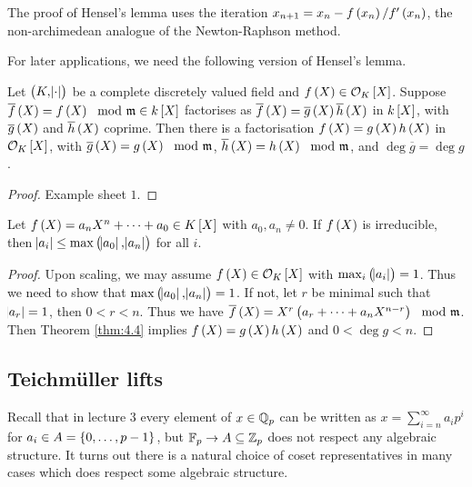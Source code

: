 \begin{remark*}
The proof of Hensel's lemma uses the iteration $ x_{n + 1} = x_n - f\br{x_n} / f'\br{x_n} $, the non-archimedean analogue of the Newton-Raphson method.
\end{remark*}

For later applications, we need the following version of Hensel's lemma.

\begin{theorem}
\label{thm:4.4}
Let $ \br{K, \abs{\cdot}} $ be a complete discretely valued field and $ f\br{X} \in \OOO_K\sbr{X} $. Suppose $ \overline{f}\br{X} = f\br{X} \mod \mmm \in k\sbr{X} $ factorises as $ \overline{f}\br{X} = \overline{g}\br{X}\overline{h}\br{X} $ in $ k\sbr{X} $, with $ \overline{g}\br{X} $ and $ \overline{h}\br{X} $ coprime. Then there is a factorisation $ f\br{X} = g\br{X}h\br{X} $ in $ \OOO_K\sbr{X} $, with $ \overline{g}\br{X} = g\br{X} \mod \mmm $, $ \overline{h}\br{X} = h\br{X} \mod \mmm $, and $ \deg \overline{g} = \deg g $.
\end{theorem}

\begin{proof}
Example sheet $ 1 $.
\end{proof}

\begin{corollary}
\label{cor:4.5}
Let $ f\br{X} = a_nX^n + \dots + a_0 \in K\sbr{X} $ with $ a_0, a_n \ne 0 $. If $ f\br{X} $ is irreducible, then $ \abs{a_i} \le \max\br{\abs{a_0}, \abs{a_n}} $ for all $ i $.
\end{corollary}

\begin{proof}
Upon scaling, we may assume $ f\br{X} \in \OOO_K\sbr{X} $ with $ \max_i \br{\abs{a_i}} = 1 $. Thus we need to show that $ \max\br{\abs{a_0}, \abs{a_n}} = 1 $. If not, let $ r $ be minimal such that $ \abs{a_r} = 1 $, then $ 0 < r < n $. Thus we have $ \overline{f}\br{X} = X^r\br{a_r + \dots + a_nX^{n - r}} \mod \mmm $. Then Theorem \ref{thm:4.4} implies $ f\br{X} = g\br{X}h\br{X} $ and $ 0 < \deg g < n $.
\end{proof}

\subsection{Teichm\"uller lifts}


Recall that in lecture $ 3 $ every element of $ x \in \mathbb{Q}_p $ can be written as $ x = \sum_{i = n}^\infty a_ip^i $ for $ a_i \in A = \cbr{0, \dots, p - 1} $, but $ \mathbb{F}_p \to A \subseteq \mathbb{Z}_p $ does not respect any algebraic structure. It turns out there is a natural choice of coset representatives in many cases which does respect some algebraic structure.

